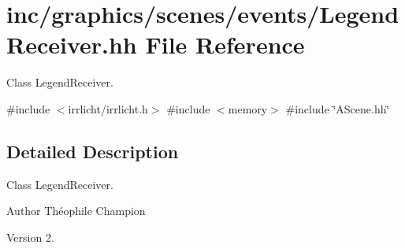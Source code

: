 \hypertarget{LegendReceiver_8hh}{}\section{inc/graphics/scenes/events/\+Legend\+Receiver.hh File Reference}
\label{LegendReceiver_8hh}


Class Legend\+Receiver.  


{\ttfamily \#include $<$irrlicht/irrlicht.\+h$>$}\newline
{\ttfamily \#include $<$memory$>$}\newline
{\ttfamily \#include \char`\"{}A\+Scene.\+hh\char`\"{}}\newline


\subsection{Detailed Description}
Class Legend\+Receiver. 

\begin{DoxyAuthor}{Author}
Théophile Champion 
\end{DoxyAuthor}
\begin{DoxyVersion}{Version}
2. 
\end{DoxyVersion}
